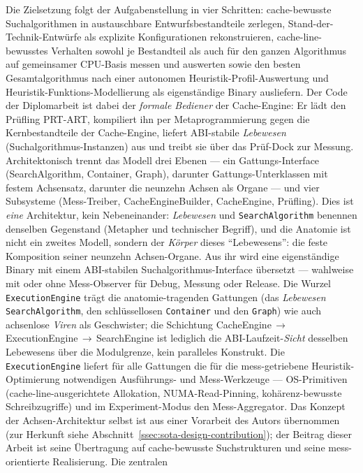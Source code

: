 Die Zielsetzung folgt der Aufgabenstellung in vier Schritten: cache-bewusste Suchalgorithmen in
austauschbare Entwurfsbestandteile zerlegen, Stand-der-Technik-Entwürfe als explizite
Konfigurationen rekonstruieren, cache-line-bewusstes Verhalten sowohl je Bestandteil als auch für
den ganzen Algorithmus auf gemeinsamer CPU-Basis messen und auswerten sowie den besten
Gesamtalgorithmus nach einer autonomen Heuristik-Profil-Auswertung und
Heuristik-Funktions-Modellierung als eigenständige Binary ausliefern. Der Code der Diplomarbeit ist
dabei der \emph{formale Bediener} der Cache-Engine: Er lädt den Prüfling PRT-ART, kompiliert ihn per
Metaprogrammierung gegen die Kernbestandteile der Cache-Engine, liefert ABI-stabile \emph{Lebewesen}
(Suchalgorithmus-Instanzen) aus und treibt sie über das Prüf-Dock zur Messung. Architektonisch
trennt das Modell drei Ebenen --- ein Gattungs-Interface (SearchAlgorithm, Container, Graph),
darunter Gattungs-Unterklassen mit festem Achsensatz, darunter die neunzehn Achsen als Organe ---
und vier Subsysteme (Mess-Treiber, CacheEngineBuilder, CacheEngine, Prüfling). Dies ist \emph{eine}
Architektur, kein Nebeneinander: \emph{Lebewesen} und \texttt{SearchAlgorithm} benennen denselben
Gegenstand (Metapher und technischer Begriff), und die Anatomie ist nicht ein zweites Modell,
sondern der \emph{Körper} dieses \enquote{Lebewesens}: die feste Komposition seiner neunzehn
Achsen-Organe. Aus ihr wird eine eigenständige Binary mit einem ABI-stabilen
Suchalgorithmus-Interface übersetzt --- wahlweise mit oder ohne Mess-Observer für Debug, Messung
oder Release. Die Wurzel \texttt{ExecutionEngine} trägt die anatomie-tragenden Gattungen (das \emph{Lebewesen} \texttt{SearchAlgorithm}, den schlüssellosen \texttt{Container} und den \texttt{Graph}) wie auch achsenlose \emph{Viren}
als Geschwister; die Schichtung
CacheEngine\,$\to$\,ExecutionEngine\,$\to$\,SearchEngine ist lediglich die ABI-Laufzeit-\emph{Sicht}
desselben Lebewesens über die Modulgrenze, kein paralleles Konstrukt. Die \texttt{ExecutionEngine}
liefert für alle Gattungen die für die mess-getriebene Heuristik-Optimierung notwendigen
Ausführungs- und Mess-Werkzeuge --- OS-Primitiven (cache-line-ausgerichtete Allokation,
NUMA-Read-Pinning, kohärenz-bewusste Schreibzugriffe) und im Experiment-Modus den Mess-Aggregator.
Das Konzept der Achsen-Architektur selbst ist aus einer Vorarbeit des Autors übernommen (zur
Herkunft siehe Abschnitt~\ref{ssec:sota-design-contribution}); der Beitrag dieser Arbeit ist seine
Übertragung auf cache-bewusste Suchstrukturen und seine mess-orientierte Realisierung. Die zentralen
